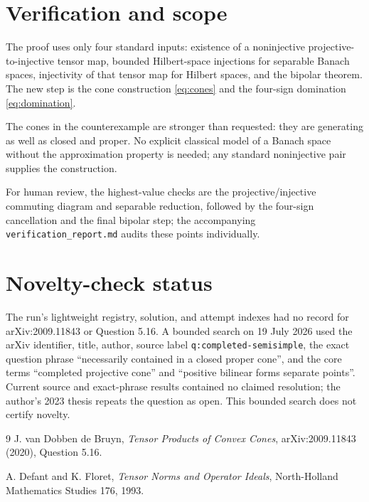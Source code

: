 \documentclass[11pt]{article}
\begin{document}
\section{Verification and scope}

The proof uses only four standard inputs: existence of a noninjective projective-to-injective tensor map, bounded Hilbert-space injections for separable Banach spaces, injectivity of that tensor map for Hilbert spaces, and the bipolar theorem.  The new step is the cone construction \eqref{eq:cones} and the four-sign domination \eqref{eq:domination}.

The cones in the counterexample are stronger than requested: they are generating as well as closed and proper.  No explicit classical model of a Banach space without the approximation property is needed; any standard noninjective pair supplies the construction.

For human review, the highest-value checks are the projective/injective commuting diagram and separable reduction, followed by the four-sign cancellation and the final bipolar step; the accompanying \texttt{verification\_report.md} audits these points individually.

\section{Novelty-check status}

The run's lightweight registry, solution, and attempt indexes had no record for arXiv:2009.11843 or Question 5.16.  A bounded search on 19 July 2026 used the arXiv identifier, title, author, source label \texttt{q:completed-semisimple}, the exact question phrase ``necessarily contained in a closed proper cone'', and the core terms ``completed projective cone'' and ``positive bilinear forms separate points''.  Current source and exact-phrase results contained no claimed resolution; the author's 2023 thesis repeats the question as open.  This bounded search does not certify novelty.

\begin{thebibliography}{9}
J. van Dobben de Bruyn,
\emph{Tensor Products of Convex Cones},
arXiv:2009.11843 (2020), Question 5.16.

A. Defant and K. Floret,
\emph{Tensor Norms and Operator Ideals},
North-Holland Mathematics Studies 176, 1993.
\end{thebibliography}
\end{document}

